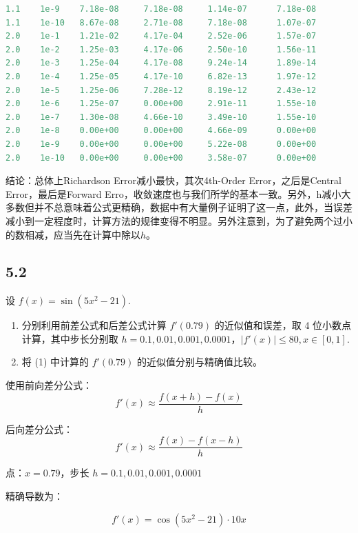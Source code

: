 \begin{lstlisting}[language=matlab]
1.1    1e-9    7.18e-08     7.18e-08     1.14e-07      7.18e-08
1.1    1e-10   8.67e-08     2.71e-08     7.18e-08      1.07e-07
2.0    1e-1    1.21e-02     4.17e-04     2.52e-06      1.57e-07
2.0    1e-2    1.25e-03     4.17e-06     2.50e-10      1.56e-11
2.0    1e-3    1.25e-04     4.17e-08     9.24e-14      1.89e-14
2.0    1e-4    1.25e-05     4.17e-10     6.82e-13      1.97e-12
2.0    1e-5    1.25e-06     7.28e-12     8.19e-12      2.43e-12
2.0    1e-6    1.25e-07     0.00e+00     2.91e-11      1.55e-10
2.0    1e-7    1.30e-08     4.66e-10     3.49e-10      1.55e-10
2.0    1e-8    0.00e+00     0.00e+00     4.66e-09      0.00e+00
2.0    1e-9    0.00e+00     0.00e+00     5.22e-08      0.00e+00
2.0    1e-10   0.00e+00     0.00e+00     3.58e-07      0.00e+00
\end{lstlisting}

结论：总体上Richardson Error减小最快，其次4th-Order Error，之后是Central Error，最后是Forward Erro，收敛速度也与我们所学的基本一致。另外，h减小大多数但并不总意味着公式更精确，数据中有大量例子证明了这一点，此外，当误差减小到一定程度时，计算方法的规律变得不明显。另外注意到，为了避免两个过小的数相减，应当先在计算中除以$h$。

\subsection*{5.2}
设 $f(x) = \sin(5x^2 - 21)$.

\begin{enumerate}
    \item 分别利用前差公式和后差公式计算 $f'(0.79)$ 的近似值和误差，取 4 位小数点计算，其中步长分别取 $h = 0.1, 0.01, 0.001, 0.0001$，$|f'(x)| \leq 80, x \in [0, 1]$.
    \item 将 (1) 中计算的 $f'(0.79)$ 的近似值分别与精确值比较。
\end{enumerate}

使用前向差分公式：
    $$
    f'(x) \approx \frac{f(x + h) - f(x)}{h}
    $$
    
后向差分公式：
    $$
    f'(x) \approx \frac{f(x) - f(x - h)}{h}
    $$
    
点：$x = 0.79$，步长 $h = 0.1, 0.01, 0.001, 0.0001$

精确导数为：

  $$
  f'(x) = \cos(5x^2 - 21) \cdot 10x
  $$

